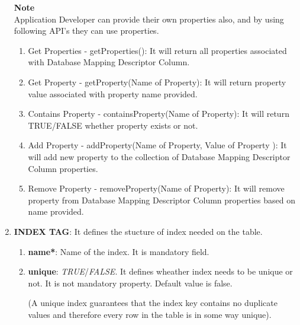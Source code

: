\begin{enumerate}
\begin{center}
{{						\hfill \textbf{Note} \\

			
						Application Developer can provide their own properties also, and by using following API's they can use properties.

						\hfill 	
						\begin{enumerate}
							\item \small Get Properties - getProperties(): It will return all properties associated with Database Mapping Descriptor Column.
							\item \small Get Property - getProperty(Name of Property): It will return property value associated with property name provided.
							\item \small Contains Property - containsProperty(Name of Property): It will return TRUE/FALSE whether property exists or not.
							\item \small Add Property - addProperty(Name of Property, Value of Property ): It will add new property to the  collection of Database Mapping Descriptor Column properties.
							\item \small Remove Property - removeProperty(Name of Property): It will remove property from Database Mapping Descriptor Column properties based on name provided.
						\end{enumerate}

						\vspace*{0.0cm} %
				}
			}

		\end{center}


	\item \small \textbf{INDEX TAG}: It defines the stucture of  index needed on the table.

		\begin{enumerate}

			\item \small \textbf{name*}: Name of the index. It is mandatory field.
			\item \small \textbf{unique}: \textit{TRUE}/\textit{FALSE}. It defines wheather index needs to be unique or not. It is not mandatory property. Default value is false.
				
				\par
				(A unique index guarantees that the index key contains no duplicate values and therefore every row in the table is in some way unique). 

		\end{enumerate}



\end{enumerate}
